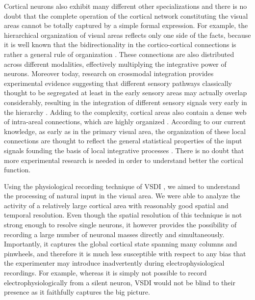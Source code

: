 Cortical neurons also exhibit many different other specializations and
there is no doubt that the complete operation of the cortical network
constituting the visual areas cannot be totally captured by a simple formal
expression. For example, the hierarchical organization of visual areas
reflects only one side of the facts, because it is well known that the
bidirectionality in the cortico-cortical connections is rather a general
rule of organization \citep{felleman1991a}. These connections are also
distributed across different modalities, effectively multiplying the
integrative power of neurons. Moreover today, research on crossmodal
integration provides experimental evidence suggesting that different
sensory pathways classically thought to be segregated \textemdash at least
in the early sensory areas \textemdash may actually overlap considerably,
resulting in the integration of different sensory signals very early in the
hierarchy \citep{dehay1988a,driver2008a,macaluso2004a}. Adding to the
complexity, cortical areas also contain a dense web of intra-areal
connections, which are highly organized \citep{rockland1982a}. According to
our current knowledge, as early as in the primary visual area, the
organization of these local connections are thought to reflect the general
statistical properties of the input signals founding the basis of local
integrative processes \citep{betsch2004a}. There is no doubt that more
experimental research is needed in order to understand better the cortical
function.


Using the physiological recording technique of VSDI \citep{grinvald2004b},
we aimed to understand the processing of natural input in the visual area.
We were able to analyze the activity of a relatively large cortical area
with reasonably good spatial and temporal resolution. Even though the
spatial resolution of this technique is not strong enough to resolve single
neurons, it however provides the possibility of recording a large number of
neuronal masses directly and simultaneously. Importantly, it captures the
global cortical state spanning many columns and pinwheels, and therefore it
is much less susceptible with respect to any bias that the experimenter may
introduce inadvertently during electrophysiological recordings. For
example, whereas it is simply not possible to record electrophysiologically
from a silent neuron, VSDI would not be blind to their presence as it
faithfully captures the big picture.

